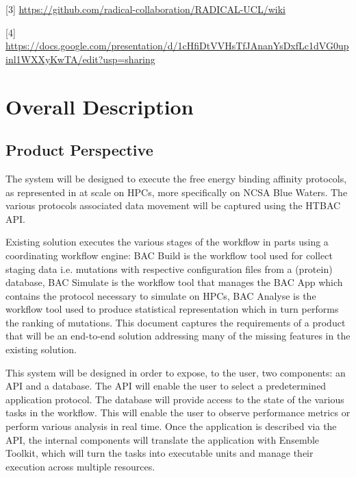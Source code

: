 \documentclass{scrreprt}
\begin{document}
[3] \url{https://github.com/radical-collaboration/RADICAL-UCL/wiki}

[4] \url{https://docs.google.com/presentation/d/1cHfiDtVVHsTfJAnanYsDxfLc1dVG0upinl1WXXyKwTA/edit?usp=sharing}

\chapter{Overall Description}

\section{Product Perspective}

The system will be designed to execute the free energy binding affinity protocols, as represented in %
at scale on HPCs, more specifically on NCSA Blue Waters. The various protocols associated data movement will be captured using the HTBAC API.

Existing solution executes the various stages of the workflow in parts using a coordinating workflow engine: BAC Build is the workflow tool used for collect staging data i.e. mutations with respective configuration files from a (protein) database, BAC Simulate is the workflow tool that manages the BAC App which contains the protocol necessary to simulate on HPCs, BAC Analyse is the workflow tool used to produce statistical representation which in turn performs the ranking of mutations. This document captures the requirements of a product that will be an end-to-end solution addressing many of the missing features in the existing solution. 

This system will be designed in order to expose, to the user, two components: an API and a database. The API will enable the user to select a predetermined application protocol. The database will provide access to the state of the various tasks in the workflow. This will enable the user to observe performance metrics or perform various analysis in real time. 
Once the application is described via the API, the internal components will translate the application with Ensemble Toolkit, which will turn the tasks into executable units and manage their execution across multiple resources. 
\end{document}

